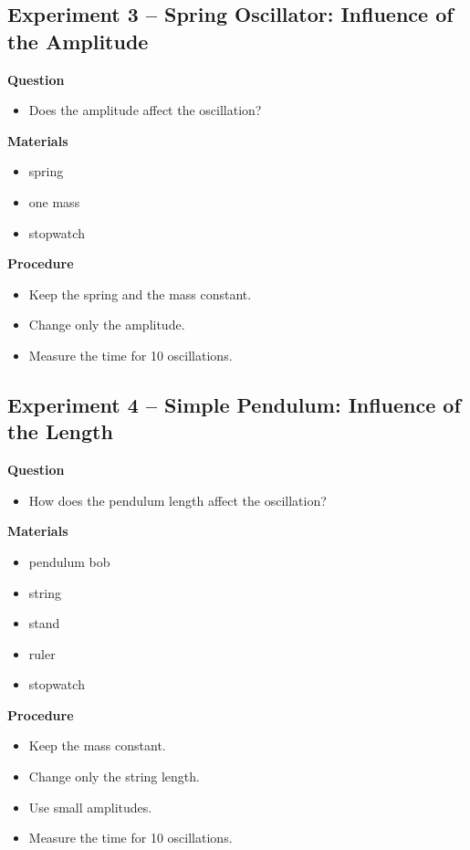 \documentclass[a4paper,11pt]{article}
\begin{document}
\subsection*{Experiment 3 -- Spring Oscillator: Influence of the Amplitude}

\textbf{Question}
\begin{itemize}
\item Does the amplitude affect the oscillation?
\end{itemize}

\textbf{Materials}
\begin{itemize}
\item spring
\item one mass
\item stopwatch
\end{itemize}

\textbf{Procedure}
\begin{itemize}
\item Keep the spring and the mass constant.
\item Change only the amplitude.
\item Measure the time for 10 oscillations.
\end{itemize}

\subsection*{Experiment 4 -- Simple Pendulum: Influence of the Length}

\textbf{Question}
\begin{itemize}
\item How does the pendulum length affect the oscillation?
\end{itemize}

\textbf{Materials}
\begin{itemize}
\item pendulum bob
\item string
\item stand
\item ruler
\item stopwatch
\end{itemize}

\textbf{Procedure}
\begin{itemize}
\item Keep the mass constant.
\item Change only the string length.
\item Use small amplitudes.
\item Measure the time for 10 oscillations.
\end{itemize}
\end{document}
